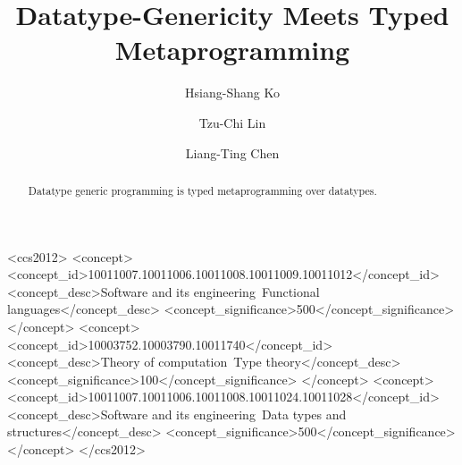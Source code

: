 \documentclass[acmsmall,review]{acmart}
\begin{document}
\title{Datatype-Genericity Meets Typed Metaprogramming}

\author{Hsiang-Shang Ko}
\author{Tzu-Chi Lin}
\author{Liang-Ting Chen}


\begin{abstract}
  Datatype generic programming is typed metaprogramming over datatypes.
\end{abstract}

\begin{CCSXML}
<ccs2012>
   <concept>
       <concept_id>10011007.10011006.10011008.10011009.10011012</concept_id>
       <concept_desc>Software and its engineering~Functional languages</concept_desc>
       <concept_significance>500</concept_significance>
       </concept>
   <concept>
       <concept_id>10003752.10003790.10011740</concept_id>
       <concept_desc>Theory of computation~Type theory</concept_desc>
       <concept_significance>100</concept_significance>
       </concept>
   <concept>
       <concept_id>10011007.10011006.10011008.10011024.10011028</concept_id>
       <concept_desc>Software and its engineering~Data types and structures</concept_desc>
       <concept_significance>500</concept_significance>
       </concept>
 </ccs2012>
\end{CCSXML}

\end{document}
